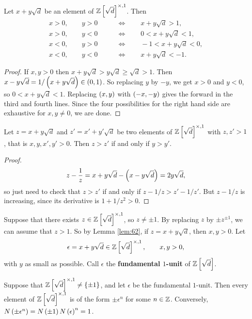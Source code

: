 \begin{lemma}
\label{lem:62}
Let $ x + y\sqrt{d} $ be an element of $ \Z\sbr{\sqrt{d}}^{\times, 1} $. Then
\begin{align*}
x > 0, \qquad y > 0 \qquad & \iff \qquad x + y\sqrt{d} > 1, \\
x > 0, \qquad y < 0 \qquad & \iff \qquad 0 < x + y\sqrt{d} < 1, \\
x < 0, \qquad y > 0 \qquad & \iff \qquad -1 < x + y\sqrt{d} < 0, \\
x < 0, \qquad y < 0 \qquad & \iff \qquad x + y\sqrt{d} < -1.
\end{align*}
\end{lemma}

\begin{proof}
If $ x, y > 0 $ then $ x + y\sqrt{d} > y\sqrt{d} \ge \sqrt{d} > 1 $. Then $ x - y\sqrt{d} = 1 / \br{x + y\sqrt{d}} \in \br{0, 1} $. So replacing $ y $ by $ -y $, we get $ x > 0 $ and $ y < 0 $, so $ 0 < x + y\sqrt{d} < 1 $. Replacing $ \br{x, y} $ with $ \br{-x, -y} $ gives the forward in the third and fourth lines. Since the four possibilities for the right hand side are exhaustive for $ x, y \ne 0 $, we are done.
\end{proof}

\begin{lemma}
\label{lem:63}
Let $ z = x + y\sqrt{d} $ and $ z' = x' + y'\sqrt{d} $ be two elements of $ \Z\sbr{\sqrt{d}}^{\times, 1} $ with $ z, z' > 1 $, that is $ x, y, x', y' > 0 $. Then $ z > z' $ if and only if $ y > y' $.
\end{lemma}

\begin{proof}
$$ z - \dfrac{1}{z} = x + y\sqrt{d} - \br{x - y\sqrt{d}} = 2y\sqrt{d}, $$
so just need to check that $ z > z' $ if and only if $ z - 1 / z > z' - 1 / z' $. But $ z - 1 / z $ is increasing, since its derivative is $ 1 + 1 / z^2 > 0 $.
\end{proof}


Suppose that there exists $ z \in \Z\sbr{\sqrt{d}}^{\times, 1} $, so $ z \ne \pm 1 $. By replacing $ z $ by $ \pm z^{\pm 1} $, we can assume that $ z > 1 $. So by Lemma \ref{lem:62}, if $ z = x + y\sqrt{d} $, then $ x, y > 0 $. Let
$$ \epsilon = x + y\sqrt{d} \in \Z\sbr{\sqrt{d}}^{\times, 1}, \qquad x, y > 0, $$
with $ y $ as small as possible. Call $ \epsilon $ the \textbf{fundamental $ 1 $-unit} of $ \Z\sbr{\sqrt{d}} $.

\begin{proposition}
Suppose that $ \Z\sbr{\sqrt{d}}^{\times, 1} \ne \cbr{\pm 1} $, and let $ \epsilon $ be the fundamental $ 1 $-unit. Then every element of $ \Z\sbr{\sqrt{d}}^{\times, 1} $ is of the form $ \pm \epsilon^n $ for some $ n \in \mathbb{Z} $. Conversely, $ N\br{\pm \epsilon^n} = N\br{\pm 1}N\br{\epsilon}^n = 1 $.
\end{proposition}

